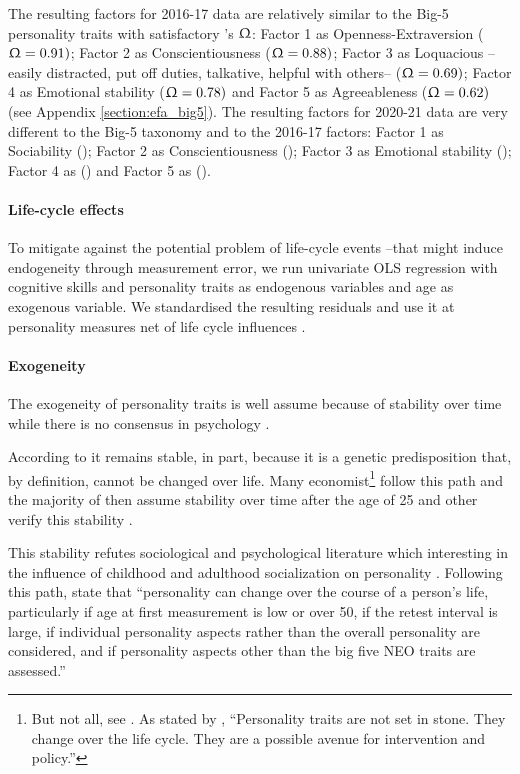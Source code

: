 \documentclass[a4paper, 11pt, onecolumn]{article}
\begin{document}
The resulting factors for 2016-17 data are relatively similar to the Big-5 personality traits with satisfactory \citeauthor{McDonald1999}'s $\Upomega$: Factor 1 as Openness-Extraversion ($\Upomega=0.91)$; Factor 2 as Conscientiousness ($\Upomega=0.88)$; Factor 3 as Loquacious --easily distracted, put off duties, talkative, helpful with others-- ($\Upomega=0.69)$; Factor 4 as Emotional stability ($\Upomega=0.78)$ and Factor 5 as Agreeableness ($\Upomega=0.62)$ (see Appendix \ref{section:efa_big5}).
The resulting factors for 2020-21 data are very different to the Big-5 taxonomy and to the 2016-17 factors: Factor 1 as Sociability (); Factor 2 as Conscientiousness (); Factor 3 as Emotional stability (); Factor 4 as () and Factor 5 as ().

\paragraph{Life-cycle effects}
To mitigate against the potential problem of life-cycle events --that might induce endogeneity through measurement error, we run univariate OLS regression with cognitive skills and personality traits as endogenous variables and age as exogenous variable. %
We standardised the resulting residuals and use it at personality measures net of life cycle influences \citep{Nyhus2005, Brown2014}. 

\paragraph{Exogeneity}
The exogeneity of personality traits is well assume because of stability over time while there is no consensus in psychology \citep{Ardelt2000}.

According to \cite{Costa1997, McCrae2000} it remains stable, in part, because it is a genetic predisposition that, by definition, cannot be changed over life.
Many economist\footnote{But not all, see \cite{Borghans2008, Almlund2011, Heckman2011}. As stated by \cite{Heckman2011}, ``Personality traits are not set in stone. They change over the life cycle. They are a possible avenue for intervention and policy.''} follow this path and the majority of then assume stability over time after the age of 25 and other verify this stability \citep{CobbClark2011}.

This stability refutes sociological and psychological literature which interesting in the influence of childhood and adulthood socialization on personality \citep{Mortimer1978, Moen1995}.
Following this path, \cite{Ardelt2000} state that ``personality can change over the course of a person's life, particularly if age at first measurement is low or over 50, if the retest interval is large, if individual personality aspects rather than the overall personality are considered, and if personality aspects other than the big five NEO traits are assessed.''
\end{document}
